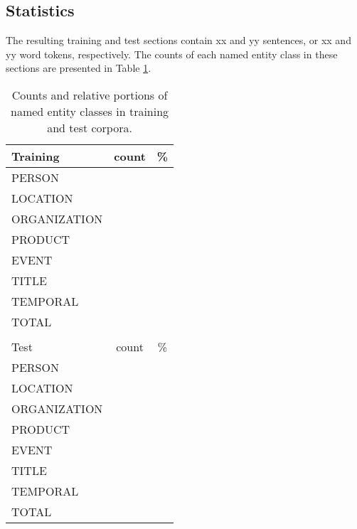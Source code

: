 \documentclass[11pt]{article}
\begin{document}


\subsection{Statistics}

The resulting training and test sections contain xx and yy sentences, or xx and yy word tokens, respectively. The counts of each named entity class in these sections are presented in Table \ref{tab: statistics}.


\begin{table}[h!]
\begin{center}
\begin{tabular}{lcc} 
\hline
\noalign{\smallskip}
Training & count & \% \\ 
\hline
\noalign{\smallskip}
PERSON & & \\
LOCATION & &  \\
ORGANIZATION & & \\
PRODUCT & & \\
EVENT & & \\
TITLE & & \\
TEMPORAL & & \\
\hline
\noalign{\smallskip}
TOTAL & & \\
& & \\
\hline
\noalign{\smallskip}
Test & count & \% \\ 
\hline
\noalign{\smallskip}
PERSON & & \\
LOCATION & &  \\
ORGANIZATION & & \\
PRODUCT & & \\
EVENT & & \\
TITLE & & \\
TEMPORAL & & \\
\hline
\noalign{\smallskip}
TOTAL & & \\\end{tabular}
\end{center}
\caption{Counts and relative portions of named entity classes in training and test corpora.}
\label{tab: statistics} 
\end{table}
\end{document}
